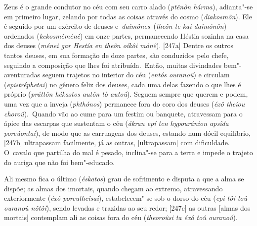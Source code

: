 Zeus é o grande condutor no céu com seu carro alado (\emph{ptênòn
hárma}), adianta"-se em primeiro lugar, zelando por todas as coisas
através do cosmo (\emph{diakosmôn}). Ele é seguido por um exército de
deuses e~\emph{daimônes}~(\emph{theôn te kaì daimónôn}) ordenados
(\emph{kekosmêménê}) em onze partes, permanecendo Héstia sozinha na casa
dos deuses (\emph{ménei gar Hestía en theôn oíkôi mónê}). [247a]
Dentre os outros tantos deuses, em sua formação de doze partes, são
conduzidos pelo chefe, seguindo a composição que lhes foi
atribuída.~Então, muitas divindades bem"-aventuradas seguem trajetos no
interior do céu (\emph{entós ouranoû}) e circulam (\emph{epistréphetai})
no gênero feliz dos deuses, cada uma delas fazendo o que lhes é próprio
(\emph{práttôn hékastos autôn tò autoû}). Seguem sempre que querem e
podem, uma vez que a inveja (\emph{phthónos}) permanece fora do coro dos
deuses (\emph{éxô theíou choroû}).~Quando vão ao cume para um festim ou
banquete, atravessam para o ápice das escarpas que sustentam o céu
(\emph{ákran epí ten hypouránion apsîda poreúontai}), de modo que as
carruagens dos deuses, estando num dócil equilíbrio, [247b]
ultrapassam facilmente, já as outras, [ultrapassam] com dificuldade.
O~cavalo que partilha do mal é pesado, inclina"-se para a terra e impede
o trajeto do auriga que não foi bem"-educado.

Ali mesmo fica o último (\emph{éskatos}) grau de sofrimento e disputa a
que a alma se dispõe; as almas dos imortais, quando chegam ao extremo,
atravessando exteriormente (\emph{éxô poreutheîsai}), estabelecem"-se sob
o dorso do céu (\emph{epì tôi toû ouranoû nôtôi}), sendo levadas e
trazidas ao seu redor; [247c] as outras [almas dos mortais]
contemplam ali as coisas fora do céu (\emph{theoroûsi ta éxô toû
ouranoû}).


